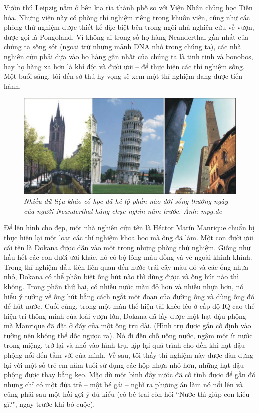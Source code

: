 \begin{multicols}{2}
	Vườn thú Leipzig nằm ở bên kia rìa thành phố so với Viện Nhân chủng học Tiến hóa. Nhưng viện này có phòng thí nghiệm riêng trong khuôn viên, cũng như các phòng thử nghiệm được thiết kế đặc biệt bên trong ngôi nhà nghiên cứu về vượn, được gọi là Pongoland. Vì không ai trong số họ hàng Neanderthal gần nhất của chúng ta sống sót (ngoại trừ những mảnh DNA nhỏ trong chúng ta), các nhà nghiên cứu phải dựa vào họ hàng gần nhất của chúng ta là tinh tinh và bonobos, hay họ hàng xa hơn là khỉ đột và đười ươi -- để thực hiện các thí nghiệm sống. Một buổi sáng, tôi đến sở thú hy vọng sẽ xem một thí nghiệm đang được tiến hành.
	\begin{figure}[H]
		\vspace*{-5pt}
		\centering
		\captionsetup{labelformat= empty, justification=centering}
		\includegraphics[width= 1\linewidth]{4}
		\caption{\small\textit{\color{timhieukhoahoc}Nhiều dữ liệu khảo cổ học đã hé lộ phần nào đời sống thường ngày của người Neanderthal hàng chục nghìn năm trước. Ảnh: mpg.de}}
		\vspace*{-5pt}
	\end{figure}
	Để lên hình cho đẹp, một nhà nghiên cứu tên là Héctor Marín Manrique chuẩn bị thực hiện lại một loạt các thí nghiệm khoa học mà ông đã làm. Một con đười ươi cái tên là Dokana được dẫn vào một trong những phòng thử nghiệm. Giống như hầu hết các con đười ươi khác, nó có bộ lông màu đồng và vẻ ngoài khinh khỉnh. Trong thí nghiệm đầu tiên liên quan đến nước trái cây màu đỏ và các ống nhựa nhỏ, Dokana có thể phân biệt ống hút nào thì dùng được và ống hút nào thì không. Trong phần thứ hai, có nhiều nước màu đỏ hơn và nhiều nhựa hơn, nó hiểu ý tưởng về ống hút bằng cách ngắt một đoạn của đường ống và dùng ống đó để hút nước. Cuối cùng, trong một màn thể hiện tài khéo léo ở cấp độ IQ cao thể hiện trí thông minh của loài vượn lớn, Dokana đã lấy được một hạt đậu phộng mà Manrique đã đặt ở đáy của một ống trụ dài. (Hình trụ được gắn cố định vào tường nên không thể dốc ngược ra). Nó đi đến chỗ uống nước, ngậm một ít nước trong miệng, trở lại và nhổ vào hình trụ, lặp lại quá trình cho đến khi hạt đậu phộng nổi đến tầm với của mình. Về sau, tôi thấy thí nghiệm này được dàn dựng lại với một số trẻ em năm tuổi sử dụng các hộp nhựa nhỏ hơn, những hạt đậu phộng được thay bằng kẹo. Mặc dù một bình đầy nước đã cố tình được để gần đó nhưng chỉ có một đứa trẻ -- một bé gái -- nghĩ ra phương án làm nó nổi lên và cũng phải sau một hồi gợi ý đủ kiểu (có bé trai còn hỏi ``Nước thì giúp con kiểu gì?", ngay trước khi bỏ cuộc).

\end{multicols}
